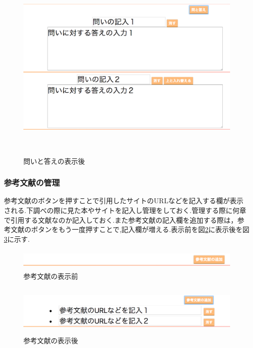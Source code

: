 \documentclass[a4j,12pt]{jarticle}
\begin{document}
\begin{figure}[h]
\begin{center}
 \includegraphics[clip,width=150mm,height=95mm]{figure/05qanda.png}
\end{center}
 \caption{問いと答えの表示後}
 \label{fig:m}
\end{figure}
\newpage

\subsubsection{参考文献の管理}
参考文献のボタンを押すことで引用したサイトのURLなどを記入する欄が表示される.下調べの際に見た本やサイトを記入し管理をしておく.管理する際に何章で引用する文献なのか記入しておく.また参考文献の記入欄を追加する際は，参考文献のボタンをもう一度押すことで,記入欄が増える.表示前を図\ref{fig:n}に表示後を図\ref{fig:o}に示す.

\begin{figure}[h]
\begin{center}
 \includegraphics[clip,width=150mm,height=10mm]{figure/06sankou.png}
\end{center}
 \caption{参考文献の表示前}
 \label{fig:n}
\end{figure}

\begin{figure}[h]
\begin{center}
 \includegraphics[clip,width=150mm,height=25mm]{figure/07sankou.png}
\end{center}
 \caption{参考文献の表示後}
 \label{fig:o}
\end{figure}
\end{document}
